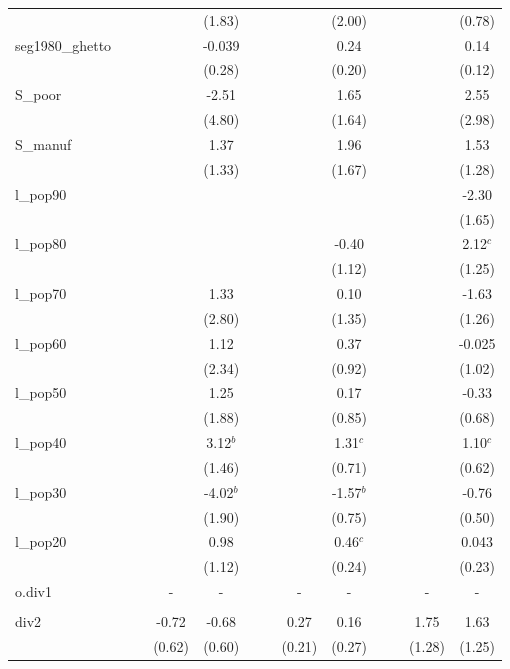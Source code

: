 \documentclass[]{article}
\begin{document}
\begin{tabular}{lcccccccccccc}
 &  &  &  & (1.83) &  &  &  & (2.00) &  &  &  & (0.78) \\
seg1980\_ghetto &  &  &  & -0.039 &  &  &  & 0.24 &  &  &  & 0.14 \\
 &  &  &  & (0.28) &  &  &  & (0.20) &  &  &  & (0.12) \\
S\_poor &  &  &  & -2.51 &  &  &  & 1.65 &  &  &  & 2.55 \\
 &  &  &  & (4.80) &  &  &  & (1.64) &  &  &  & (2.98) \\
S\_manuf &  &  &  & 1.37 &  &  &  & 1.96 &  &  &  & 1.53 \\
 &  &  &  & (1.33) &  &  &  & (1.67) &  &  &  & (1.28) \\
l\_pop90 &  &  &  &  &  &  &  &  &  &  &  & -2.30 \\
 &  &  &  &  &  &  &  &  &  &  &  & (1.65) \\
l\_pop80 &  &  &  &  &  &  &  & -0.40 &  &  &  & 2.12$^c$ \\
 &  &  &  &  &  &  &  & (1.12) &  &  &  & (1.25) \\
l\_pop70 &  &  &  & 1.33 &  &  &  & 0.10 &  &  &  & -1.63 \\
 &  &  &  & (2.80) &  &  &  & (1.35) &  &  &  & (1.26) \\
l\_pop60 &  &  &  & 1.12 &  &  &  & 0.37 &  &  &  & -0.025 \\
 &  &  &  & (2.34) &  &  &  & (0.92) &  &  &  & (1.02) \\
l\_pop50 &  &  &  & 1.25 &  &  &  & 0.17 &  &  &  & -0.33 \\
 &  &  &  & (1.88) &  &  &  & (0.85) &  &  &  & (0.68) \\
l\_pop40 &  &  &  & 3.12$^b$ &  &  &  & 1.31$^c$ &  &  &  & 1.10$^c$ \\
 &  &  &  & (1.46) &  &  &  & (0.71) &  &  &  & (0.62) \\
l\_pop30 &  &  &  & -4.02$^b$ &  &  &  & -1.57$^b$ &  &  &  & -0.76 \\
 &  &  &  & (1.90) &  &  &  & (0.75) &  &  &  & (0.50) \\
l\_pop20 &  &  &  & 0.98 &  &  &  & 0.46$^c$ &  &  &  & 0.043 \\
 &  &  &  & (1.12) &  &  &  & (0.24) &  &  &  & (0.23) \\
o.div1 &  &  & - & - &  &  & - & - &  &  & - & - \\
 &  &  &  &  &  &  &  &  &  &  &  &  \\
div2 &  &  & -0.72 & -0.68 &  &  & 0.27 & 0.16 &  &  & 1.75 & 1.63 \\
 &  &  & (0.62) & (0.60) &  &  & (0.21) & (0.27) &  &  & (1.28) & (1.25) \\

\end{tabular}
\end{document}
